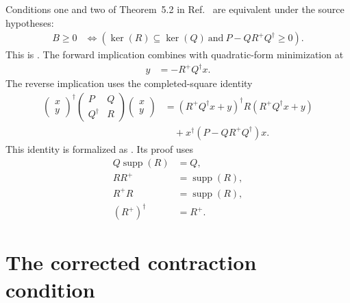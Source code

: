 \documentclass{article}
\begin{document}
Conditions one and two of Theorem~5.2 in Ref.~\cite{Wolf2012Quantum} are
equivalent under the source hypotheses:
\begin{align}
    B\geq0
        &\Longleftrightarrow
        \left(\ker(R)\subseteq\ker(Q)
            \ \text{and}\
            P-QR^+Q^\dagger\geq0\right).
    \label{eq:wolf_schur_complement_tfae_block_schur_equivalence}
\end{align}
This is
. The forward implication
combines
 with quadratic-form
minimization at
\begin{align}
    y&=-R^+Q^\dagger x.
    \label{eq:wolf_schur_complement_tfae_minimizing_vector}
\end{align}
The reverse implication uses the completed-square identity
\begin{align}
    \begin{pmatrix}x\\y\end{pmatrix}^{\!\dagger}
    \begin{pmatrix}P&Q\\Q^\dagger&R\end{pmatrix}
    \begin{pmatrix}x\\y\end{pmatrix}
        &=
        (R^+Q^\dagger x+y)^\dagger
        R(R^+Q^\dagger x+y)
    \label{eq:wolf_schur_complement_tfae_completed_square_positive_term}\\
        &\quad+
        x^\dagger(P-QR^+Q^\dagger)x.
    \label{eq:wolf_schur_complement_tfae_completed_square_schur_term}
\end{align}
This identity is formalized as
. Its proof uses
\begin{align}
    Q\operatorname{supp}(R)&=Q,
    \label{eq:wolf_schur_complement_tfae_support_absorption}\\
    RR^+&=\operatorname{supp}(R),
    \label{eq:wolf_schur_complement_tfae_pseudoinverse_left}\\
    R^+R&=\operatorname{supp}(R),
    \label{eq:wolf_schur_complement_tfae_pseudoinverse_right}\\
    (R^+)^\dagger&=R^+.
    \label{eq:wolf_schur_complement_tfae_pseudoinverse_adjoint}
\end{align}

\section{The corrected contraction condition}
\end{document}
